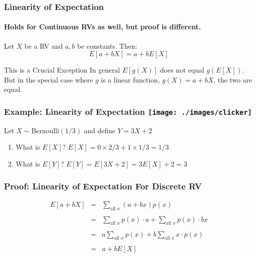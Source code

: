 \begin{frame}
\frametitle{Linearity of Expectation}
\framesubtitle{Holds for Continuous RVs as well, but proof is different.}
Let $X$ be a RV and $a,b$ be constants. Then:
	$$E[a + bX] = a + bE[X]$$

  \begin{alertblock}{This is a Crucial Exception}
    In general $E[g(X)]$ does not equal $g(E[X])$.
    But in the special case where $g$ is a \alert{linear function}, $g(X) = a + bX$, the two \alert{are equal}.
\end{alertblock}
\end{frame}
\begin{frame}
\frametitle{Example: Linearity of Expectation \hfill \texttt{[image: ./images/clicker]} }
Let $X \sim \mbox{Bernoulli}(1/3)$ and define $Y = 3X + 2$
\vspace{1em}

\begin{enumerate}
  \item What is $E[X]$? \pause \hspace{2em} \alert{$E[X] = 0 \times 2/3 + 1 \times 1/3 = 1/3$} \pause
  \item What is $E[Y]$? \pause \hspace{2em} \alert{$E[Y] = E[3X + 2] = 3E[X] + 2 = 3$}
\end{enumerate}
\end{frame}

\begin{frame}
\frametitle{Proof: Linearity of Expectation For Discrete RV}

\begin{eqnarray*}
	E[a + bX] &=& \sum_{\mbox{all } x}  (a + bx) p(x)\\ \\
	 &=&  \sum_{\mbox{all } x} p(x) \cdot a + \sum_{\mbox{all } x}p(x) \cdot bx\\ \\
	&=&  a\sum_{\mbox{all } x} p(x) + b\sum_{\mbox{all } x} x \cdot p(x) \\ \\
	&=&  a + b E[X]
\end{eqnarray*}


\end{frame}
